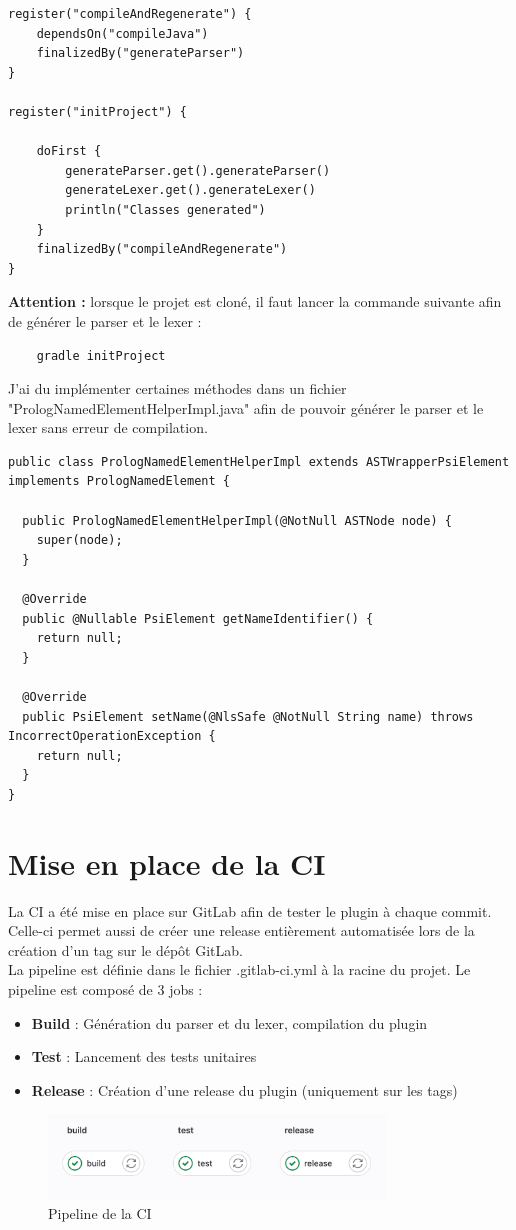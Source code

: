 \begin{lstlisting}
register("compileAndRegenerate") {
    dependsOn("compileJava")
    finalizedBy("generateParser")
}

register("initProject") {

    doFirst {
        generateParser.get().generateParser()
        generateLexer.get().generateLexer()
        println("Classes generated")
    }
    finalizedBy("compileAndRegenerate")
}
\end{lstlisting}

\noindent \textbf{Attention :} lorsque le projet est cloné, il faut lancer la commande suivante afin de générer le parser et le lexer :
\begin{lstlisting}
    gradle initProject
\end{lstlisting}

\noindent J'ai du implémenter certaines méthodes dans un fichier "PrologNamedElementHelperImpl.java" afin de pouvoir générer le parser et le lexer sans erreur de compilation.

\begin{lstlisting}
public class PrologNamedElementHelperImpl extends ASTWrapperPsiElement implements PrologNamedElement {

  public PrologNamedElementHelperImpl(@NotNull ASTNode node) {
    super(node);
  }

  @Override
  public @Nullable PsiElement getNameIdentifier() {
    return null;
  }

  @Override
  public PsiElement setName(@NlsSafe @NotNull String name) throws IncorrectOperationException {
    return null;
  }
}
\end{lstlisting}


\section{Mise en place de la CI}
\noindent La CI a été mise en place sur GitLab afin de tester le plugin à chaque commit.
Celle-ci permet aussi de créer une release entièrement automatisée lors de la création d'un tag sur le dépôt GitLab.
\\ \noindent La pipeline est définie dans le fichier .gitlab-ci.yml à la racine du projet.
\newdoubleline
\noindent Le pipeline est composé de 3 jobs :
\begin{itemize}
    \item \textbf{Build} : Génération du parser et du lexer, compilation du plugin
    \item \textbf{Test} : Lancement des tests unitaires
    \item \textbf{Release} : Création d'une release du plugin (uniquement sur les tags)
\end{itemize}

\begin{figure}[H]
    \centering
    \includegraphics[width=0.8\textwidth]{images/Pipeline.png}
    \caption{Pipeline de la CI}
    \label{fig:gitlab-ci}
\end{figure}
